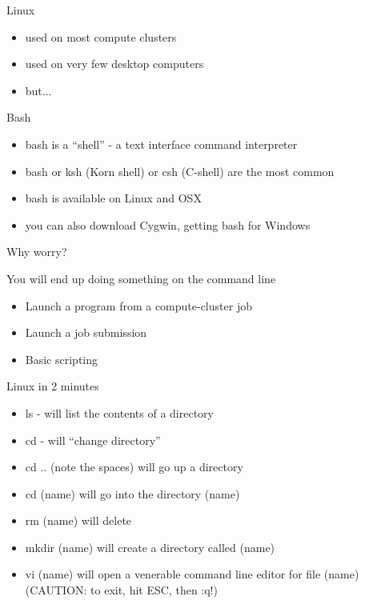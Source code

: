 \documentclass[xcolor=table,compress]{beamer}
\begin{document}
\begin{frame}
\begin{block}{Linux}
\begin{itemize}
\item used on most compute clusters
\item used on very few desktop computers
\item but...
\end{itemize}
\end{block}
\pause
\begin{block}{Bash}
\begin{itemize}
\item bash is a ``shell'' - a text interface command interpreter
\item bash or ksh (Korn shell) or csh (C-shell) are the most common
\item bash is available on Linux and \pause OSX
\item you can also download Cygwin, getting bash for Windows
\end{itemize}
\end{block}
\end{frame}


\begin{frame}{Why worry?}
\begin{block}{You will end up doing something on the command line}
\begin{itemize}[<+->]
\item Launch a program from a compute-cluster job
\item Launch a job submission
\item Basic scripting
\end{itemize}
\end{block}
\end{frame}

\begin{frame}[frame]{Linux in 2 minutes}
\begin{itemize}
\item ls - will list the contents of a directory
\item cd - will ``change directory''
\item cd .. (note the spaces) will go up a directory
\item cd (name) will go into the directory (name)
\item rm (name) will delete
\item mkdir (name) will create a directory called (name)
\item vi (name) will open a venerable command line editor for file (name) \pause (CAUTION: to exit, hit ESC, then :q!)
\end{itemize}
\end{frame}
\end{document}
